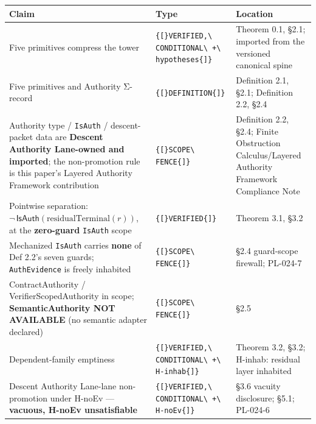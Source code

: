 \documentclass[
  10pt,
]{article}
\DeclareRobustCommand{\texttt}[1]{{\paperSymbolFont\nolinkurl{#1}}}
\begin{document}
\begin{longtable}[]{@{}
  >{\raggedright\arraybackslash}p{}
  >{\raggedright\arraybackslash}p{}
  >{\raggedright\arraybackslash}p{}@{}}
\toprule\noalign{}
\begin{minipage}[b]{\linewidth}\raggedright
Claim
\end{minipage} & \begin{minipage}[b]{\linewidth}\raggedright
Type
\end{minipage} & \begin{minipage}[b]{\linewidth}\raggedright
Location
\end{minipage} \\
\midrule\noalign{}
\endhead
\bottomrule\noalign{}
\endlastfoot
Five primitives compress the tower & \texttt{{[}VERIFIED,\ CONDITIONAL\ +\ hypotheses{]}} & Theorem 0.1, §2.1; imported from the versioned canonical spine \\
Five primitives and Authority Σ-record & \texttt{{[}DEFINITION{]}} & Definition 2.1, §2.1; Definition 2.2, §2.4 \\
Authority type / \texttt{IsAuth} / descent-packet data are \textbf{Descent Authority Lane-owned and imported}; the non-promotion rule is this paper's Layered Authority Framework contribution & \texttt{{[}SCOPE\ FENCE{]}} & Definition 2.2, §2.4; Finite Obstruction Calculus/Layered Authority Framework Compliance Note \\
Pointwise separation: \protect\hypertarget{math-E0044-0149}{}{\(\neg\,\mathsf{IsAuth}(\mathrm{residualTerminal}(r))\)}, at the \textbf{zero-guard} \texttt{IsAuth} scope & \texttt{{[}VERIFIED{]}} & Theorem 3.1, §3.2 \\
Mechanized \texttt{IsAuth} carries \textbf{none} of Def 2.2's seven guards; \texttt{AuthEvidence} is freely inhabited & \texttt{{[}SCOPE\ FENCE{]}} & §2.4 guard-scope firewall; PL-024-7 \\
ContractAuthority / VerifierScopedAuthority in scope; \textbf{SemanticAuthority NOT AVAILABLE} (no semantic adapter declared) & \texttt{{[}SCOPE\ FENCE{]}} & §2.5 \\
Dependent-family emptiness & \texttt{{[}VERIFIED,\ CONDITIONAL\ +\ H-inhab{]}} & Theorem 3.2, §3.2; H-inhab: residual layer inhabited \\
Descent Authority Lane-lane non-promotion under H-noEv --- \textbf{vacuous, H-noEv unsatisfiable} & \texttt{{[}VERIFIED,\ CONDITIONAL\ +\ H-noEv{]}} & §3.6 vacuity disclosure; §5.1; PL-024-6 \\

\end{longtable}
\end{document}
